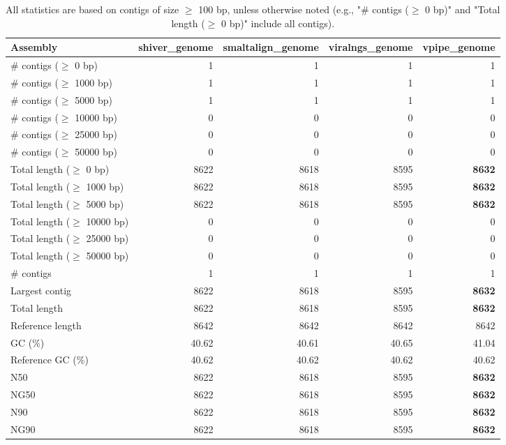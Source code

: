 \documentclass[12pt,a4paper]{article}
\begin{document}
\begin{table}[ht]
\begin{center}
\caption{All statistics are based on contigs of size $\geq$ 100 bp, unless otherwise noted (e.g., "\# contigs ($\geq$ 0 bp)" and "Total length ($\geq$ 0 bp)" include all contigs).}
\begin{tabular}{|l*{4}{|r}|}
\hline
Assembly & shiver\_genome & smaltalign\_genome & viralngs\_genome & vpipe\_genome \\ \hline
\# contigs ($\geq$ 0 bp) & 1 & 1 & 1 & 1 \\ \hline
\# contigs ($\geq$ 1000 bp) & 1 & 1 & 1 & 1 \\ \hline
\# contigs ($\geq$ 5000 bp) & 1 & 1 & 1 & 1 \\ \hline
\# contigs ($\geq$ 10000 bp) & 0 & 0 & 0 & 0 \\ \hline
\# contigs ($\geq$ 25000 bp) & 0 & 0 & 0 & 0 \\ \hline
\# contigs ($\geq$ 50000 bp) & 0 & 0 & 0 & 0 \\ \hline
Total length ($\geq$ 0 bp) & 8622 & 8618 & 8595 & {\bf 8632} \\ \hline
Total length ($\geq$ 1000 bp) & 8622 & 8618 & 8595 & {\bf 8632} \\ \hline
Total length ($\geq$ 5000 bp) & 8622 & 8618 & 8595 & {\bf 8632} \\ \hline
Total length ($\geq$ 10000 bp) & 0 & 0 & 0 & 0 \\ \hline
Total length ($\geq$ 25000 bp) & 0 & 0 & 0 & 0 \\ \hline
Total length ($\geq$ 50000 bp) & 0 & 0 & 0 & 0 \\ \hline
\# contigs & 1 & 1 & 1 & 1 \\ \hline
Largest contig & 8622 & 8618 & 8595 & {\bf 8632} \\ \hline
Total length & 8622 & 8618 & 8595 & {\bf 8632} \\ \hline
Reference length & 8642 & 8642 & 8642 & 8642 \\ \hline
GC (\%) & 40.62 & 40.61 & 40.65 & 41.04 \\ \hline
Reference GC (\%) & 40.62 & 40.62 & 40.62 & 40.62 \\ \hline
N50 & 8622 & 8618 & 8595 & {\bf 8632} \\ \hline
NG50 & 8622 & 8618 & 8595 & {\bf 8632} \\ \hline
N90 & 8622 & 8618 & 8595 & {\bf 8632} \\ \hline
NG90 & 8622 & 8618 & 8595 & {\bf 8632} \\ \hline

\end{tabular}
\end{center}
\end{table}
\end{document}

